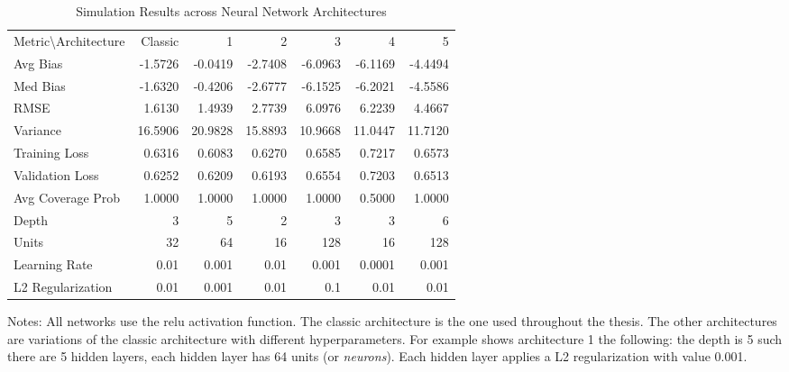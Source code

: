 \begin{table}[ht]
\centering

\begin{threeparttable}
\caption{Simulation Results across Neural Network Architectures}
\label{tab:nn}
\begin{tabular}{lrrrrrr}
    \toprule
\hline
\addlinespace
Metric\textbackslash Architecture & Classic &  1 &  2 &  3 &  4 &  5 \\
\addlinespace
\hline
\addlinespace
Avg Bias & -1.5726 & -0.0419 & -2.7408 & -6.0963 & -6.1169 & -4.4494 \\
Med Bias & -1.6320 & -0.4206 & -2.6777 & -6.1525 & -6.2021 & -4.5586 \\
RMSE & 1.6130 & 1.4939 & 2.7739 & 6.0976 & 6.2239 & 4.4667 \\
Variance & 16.5906 & 20.9828 & 15.8893 & 10.9668 & 11.0447 & 11.7120 \\
Training Loss & 0.6316 & 0.6083 & 0.6270 & 0.6585 & 0.7217 & 0.6573 \\
Validation Loss & 0.6252 & 0.6209 & 0.6193 & 0.6554 & 0.7203 & 0.6513 \\
Avg Coverage Prob & 1.0000 & 1.0000 & 1.0000 & 1.0000 & 0.5000 & 1.0000 \\
\addlinespace
\hline
\addlinespace
Depth & 3 & 5 & 2 & 3 & 3 & 6 \\
Units & 32 & 64 & 16 & 128 & 16 & 128 \\
Learning Rate & 0.01 & 0.001 & 0.01 & 0.001 & 0.0001 & 0.001 \\
L2 Regularization & 0.01 & 0.001 & 0.01 & 0.1 & 0.01 & 0.01 \\
\hline
\end{tabular}
\begin{tablenotes}
    \item Notes: All networks use the \ac{relu} activation function. The classic architecture is the one used throughout the thesis. The other architectures are variations of the classic architecture with different hyperparameters. For example shows architecture 1 the following: the depth is 5 such there are 5 hidden layers, each hidden layer has 64 units (or \textit{neurons}). Each hidden layer applies a L2 regularization with value 0.001.
\end{tablenotes}
\end{threeparttable}
\end{table}
